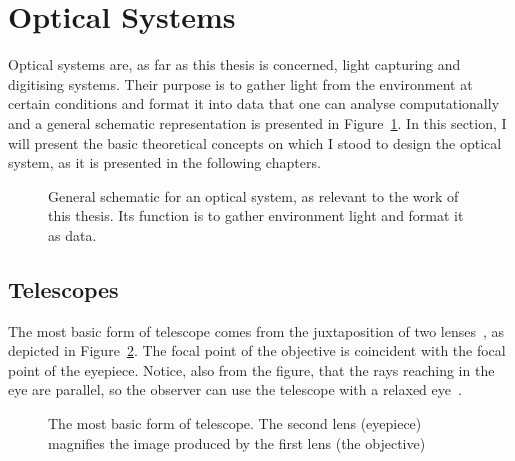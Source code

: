 \section{Optical Systems}%
\label{sec:theobg_opticalsystems}

Optical systems are, as far as this thesis is concerned, light capturing
and digitising systems. Their purpose is to gather light from the
environment at certain conditions and format it into data that one can
analyse computationally and a general schematic representation is
presented in Figure~\ref{fig:theobg_opticalsystems_generalschematic}.
In this section, I will present the basic theoretical concepts on which
I stood to design the optical system, as it is presented in the
following chapters. 

\begin{figure}[htpb]
    \centering
    \missingfigure{}
    \caption{General schematic for an optical system, as relevant to the
    work of this thesis. Its function is to gather environment light and
    format it as data.}%
    \label{fig:theobg_opticalsystems_generalschematic}
\end{figure}

\subsection{Telescopes}%
\label{sub:theobg_opticalsystems_telescopes}

The most basic form of telescope comes from the juxtaposition of two
lenses~, as depicted in
Figure~\ref{fig:basic_telescope}. The focal point of the objective is
coincident with the focal point of the eyepiece. Notice, also from the
figure, that the rays reaching in the eye are parallel, so the observer
can use the telescope with a relaxed eye~.

\begin{figure}[htpb]
    \centering
    \missingfigure{}
    \caption{The most basic form of telescope. The second lens
    (eyepiece) magnifies the image produced by the first lens (the
    objective)}%
    \label{fig:basic_telescope}
\end{figure}

